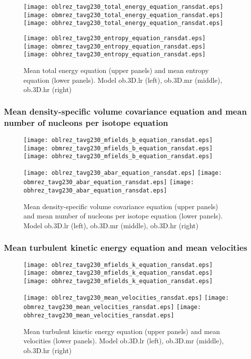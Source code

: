 \documentclass[10pt,paper=a4]{report}
\begin{document}
\begin{figure}[!h]
\centerline{
\texttt{[image: oblrez\_tavg230\_total\_energy\_equation\_ransdat.eps]}
\texttt{[image: obmrez\_tavg230\_total\_energy\_equation\_ransdat.eps]}
\texttt{[image: obhrez\_tavg230\_total\_energy\_equation\_ransdat.eps]}}

\centerline{
\texttt{[image: oblrez\_tavg230\_entropy\_equation\_ransdat.eps]}
\texttt{[image: obmrez\_tavg230\_entropy\_equation\_ransdat.eps]}
\texttt{[image: obhrez\_tavg230\_entropy\_equation\_ransdat.eps]}}
\caption{Mean total energy equation (upper panels) and mean entropy equation (lower panels). Model {\sf ob.3D.lr} (left), {\sf ob.3D.mr} (middle), {\sf ob.3D.hr} (right) \label{fig:ob-res-et-ss-equation}}
\end{figure}

\newpage

\subsubsection{Mean density-specific volume covariance equation and mean number of nucleons per isotope equation}

\begin{figure}[!h]
\centerline{
\texttt{[image: oblrez\_tavg230\_mfields\_b\_equation\_ransdat.eps]}
\texttt{[image: obmrez\_tavg230\_mfields\_b\_equation\_ransdat.eps]}
\texttt{[image: obhrez\_tavg230\_mfields\_b\_equation\_ransdat.eps]}}

\centerline{
\texttt{[image: oblrez\_tavg230\_abar\_equation\_ransdat.eps]}
\texttt{[image: obmrez\_tavg230\_abar\_equation\_ransdat.eps]}
\texttt{[image: obhrez\_tavg230\_abar\_equation\_ransdat.eps]}}
\caption{Mean density-specific volume covariance equation (upper panels) and mean number of nucleons per isotope equation (lower panels). Model {\sf ob.3D.lr} (left), {\sf ob.3D.mr} (middle), {\sf ob.3D.hr} (right) \label{fig:ob-res-b-A-equation}}
\end{figure}

\newpage

\subsubsection{Mean turbulent kinetic energy equation and mean velocities}

\begin{figure}[!h]
\centerline{
\texttt{[image: oblrez\_tavg230\_mfields\_k\_equation\_ransdat.eps]}
\texttt{[image: obmrez\_tavg230\_mfields\_k\_equation\_ransdat.eps]}
\texttt{[image: obhrez\_tavg230\_mfields\_k\_equation\_ransdat.eps]}}

\centerline{
\texttt{[image: oblrez\_tavg230\_mean\_velocities\_ransdat.eps]}
\texttt{[image: obmrez\_tavg230\_mean\_velocities\_ransdat.eps]}
\texttt{[image: obhrez\_tavg230\_mean\_velocities\_ransdat.eps]}}
\caption{Mean turbulent kinetic energy equation (upper panels) and mean velocities (lower panels). Model {\sf ob.3D.lr} (left), {\sf ob.3D.mr} (middle), {\sf ob.3D.hr} (right) \label{fig:ob-res-k-vel-equation}}
\end{figure}
\end{document}
